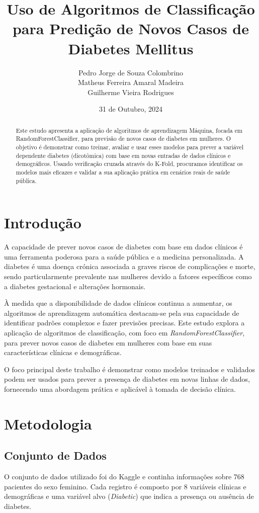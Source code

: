 \documentclass[a4paper,12pt]{article}
\title{Uso de Algoritmos de Classificação para Predição de Novos Casos de Diabetes Mellitus}
\author{Pedro Jorge de Souza Colombrino \\ Matheus Ferreira Amaral Madeira \\ Guilherme Vieira Rodrigues}
\date{31 de Outubro, 2024}
\begin{document}
\maketitle

\begin{abstract}
Este estudo apresenta a aplicação de algoritmos de aprendizagem
Máquina, focada em RandomForestClassifier, para previsão de novos casos de diabetes em mulheres. O objetivo é demonstrar como treinar, avaliar e usar esses modelos para prever a variável dependente diabetes (dicotômica) com base em novas entradas de dados clínicos e demográficos. Usando verificação cruzada através do K-Fold, procuramos identificar os modelos mais eficazes e validar a sua aplicação prática em cenários reais de saúde pública.
\end{abstract}

\section{Introdução}

A capacidade de prever novos casos de diabetes com base em dados clínicos é uma ferramenta poderosa para a saúde pública e a medicina personalizada. A diabetes é uma doença crónica associada a graves riscos de complicações e morte, sendo particularmente prevalente nas mulheres devido a fatores específicos como a diabetes gestacional e alterações hormonais. 

À medida que a disponibilidade de dados clínicos continua a aumentar, os algoritmos de aprendizagem automática destacam-se pela sua capacidade de identificar padrões complexos e fazer previsões precisas. Este estudo explora a aplicação de algoritmos de classificação, com foco em \textit{RandomForestClassifier}, para prever novos casos de diabetes em mulheres com base em suas características clínicas e demográficas.

O foco principal deste trabalho é demonstrar como modelos treinados e validados podem ser usados para prever a presença de diabetes em novas linhas de dados, fornecendo uma abordagem prática e aplicável à tomada de decisão clínica.

\section{Metodologia}

\subsection{Conjunto de Dados}
O conjunto de dados utilizado foi do Kaggle e continha informações sobre 768 pacientes do sexo feminino. Cada registro é composto por 8 variáveis clínicas e demográficas e uma variável alvo (\textit{Diabetic}) que indica a presença ou ausência de diabetes.
\end{document}
